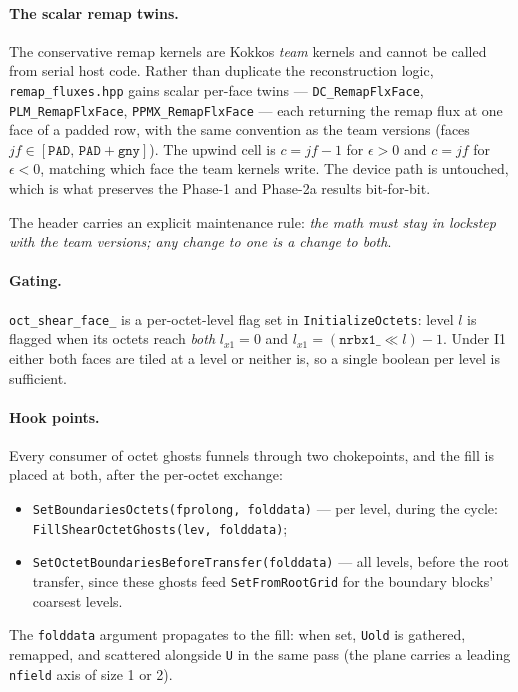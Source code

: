 \documentclass[11pt]{article}
\newcommand{\code}[1]{\texttt{#1}}
\newcommand{\file}[1]{\texttt{\small #1}}
\newcommand{\fn}[1]{\texttt{\small #1}}
\begin{document}
\paragraph{The scalar remap twins.} The conservative remap kernels are Kokkos
\emph{team} kernels and cannot be called from serial host code. Rather than
duplicate the reconstruction logic, \file{remap\_fluxes.hpp} gains scalar per-face
twins --- \fn{DC\_RemapFlxFace}, \fn{PLM\_RemapFlxFace}, \fn{PPMX\_RemapFlxFace} ---
each returning the remap flux at one face of a padded row, with the same convention as
the team versions (faces $jf \in [\code{PAD},\, \code{PAD}+\code{gny}]$). The
upwind cell is $c = jf-1$ for $\epsilon > 0$ and $c = jf$ for $\epsilon < 0$, matching
which face the team kernels write. The device path is untouched, which is what
preserves the Phase-1 and Phase-2a results bit-for-bit.

The header carries an explicit maintenance rule: \emph{the math must stay in lockstep
with the team versions; any change to one is a change to both}.

\paragraph{Gating.} \code{oct\_shear\_face\_} is a per-octet-level flag set in
\fn{InitializeOctets}: level $l$ is flagged when its octets reach \emph{both}
$l_{x1} = 0$ and $l_{x1} = (\code{nrbx1\_} \ll l) - 1$. Under I1 either both faces are
tiled at a level or neither is, so a single boolean per level is sufficient.

\paragraph{Hook points.} Every consumer of octet ghosts funnels through two
chokepoints, and the fill is placed at both, after the per-octet exchange:
\begin{itemize}\itemsep2pt
\item \fn{SetBoundariesOctets(fprolong, folddata)} --- per level, during the cycle:
      \code{FillShearOctetGhosts(lev, folddata)};
\item \fn{SetOctetBoundariesBeforeTransfer(folddata)} --- all levels, before the
      root transfer, since these ghosts feed \fn{SetFromRootGrid} for the boundary
      blocks' coarsest levels.
\end{itemize}
The \code{folddata} argument propagates to the fill: when set, \code{Uold} is
gathered, remapped, and scattered alongside \code{U} in the same pass (the plane
carries a leading \code{nfield} axis of size 1 or 2).
\end{document}

